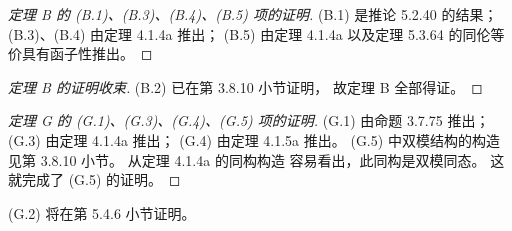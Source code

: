 \begin{proof}[定理 B 的 \textup{(B.1)、(B.3)、(B.4)、(B.5)} 项的证明]
\textup{(B.1)} 是推论 5.2.40 的结果；
\textup{(B.3)}、\textup{(B.4)}
由定理 4.1.4a 推出；
\textup{(B.5)} 由定理 4.1.4a
以及定理 5.3.64 的同伦等价具有函子性推出。
\end{proof}

\begin{proof}[定理 B 的证明收束]
\textup{(B.2)} 已在第 3.8.10 小节证明，
故定理 B 全部得证。
\end{proof}

\begin{proof}[定理 G 的 \textup{(G.1)、(G.3)、(G.4)、(G.5)} 项的证明]
\textup{(G.1)} 由命题 3.7.75 推出；
\textup{(G.3)} 由定理 4.1.4a 推出；
\textup{(G.4)} 由定理 4.1.5a 推出。
\textup{(G.5)} 中双模结构的构造
见第 3.8.10 小节。
从定理 4.1.4a 的同构构造
容易看出，此同构是双模同态。
这就完成了 \textup{(G.5)} 的证明。
\end{proof}

\textup{(G.2)} 将在第 5.4.6 小节证明。
